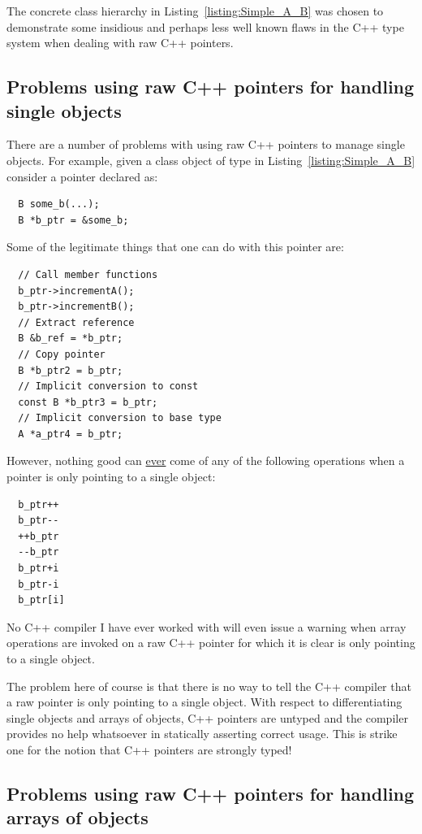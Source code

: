 \documentclass[pdf,ps2pdf,11pt]{SANDreport}
\begin{document}
The concrete class hierarchy in Listing~\ref{listing:Simple_A_B} was
chosen to demonstrate some insidious and perhaps less well known flaws
in the C++ type system when dealing with raw C++ pointers.


%
{}\subsection{Problems using raw C++ pointers for handling single objects}
%

There are a number of problems with using raw C++ pointers to manage
single objects.  For example, given a class object of type {}
in Listing~\ref{listing:Simple_A_B} consider a pointer declared as:

{\small\begin{verbatim}
  B some_b(...);
  B *b_ptr = &some_b;
\end{verbatim}}

Some of the legitimate things that one can do with this pointer are:

{\small\begin{verbatim}
  // Call member functions
  b_ptr->incrementA();
  b_ptr->incrementB();
  // Extract reference
  B &b_ref = *b_ptr;
  // Copy pointer
  B *b_ptr2 = b_ptr;
  // Implicit conversion to const
  const B *b_ptr3 = b_ptr;
  // Implicit conversion to base type
  A *a_ptr4 = b_ptr;
\end{verbatim}}

However, nothing good can {}\underline{ever} come of any of the
following operations when a pointer is only pointing to a single
object:

{\small\begin{verbatim}
  b_ptr++
  b_ptr--
  ++b_ptr
  --b_ptr
  b_ptr+i
  b_ptr-i
  b_ptr[i]
\end{verbatim}}

No C++ compiler I have ever worked with will even issue a warning when
array operations are invoked on a raw C++ pointer for which it is
clear is only pointing to a single object.

The problem here of course is that there is no way to tell the C++
compiler that a raw pointer is only pointing to a single object.  With
respect to differentiating single objects and arrays of objects, C++
pointers are untyped and the compiler provides no help whatsoever in
statically asserting correct usage.  This is strike one for the notion
that C++ pointers are strongly typed!


%
{}\subsection{Problems using raw C++ pointers for handling arrays of
objects}
\label{sec:problem-with-raw-array-pointers}
%
\end{document}
